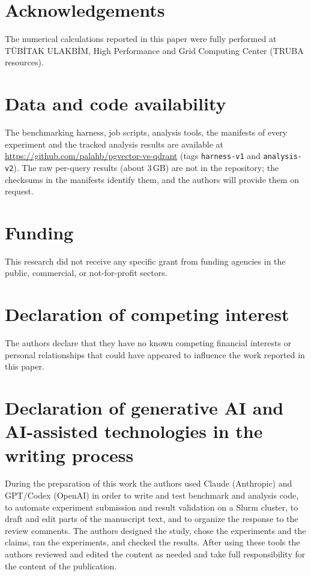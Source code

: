 \documentclass[preprint,12pt]{elsarticle}
\begin{document}
\section*{Acknowledgements}
The numerical calculations reported in this paper were fully performed at TÜBİTAK
ULAKBİM, High Performance and Grid Computing Center (TRUBA resources).

\section*{Data and code availability}
The benchmarking harness, job scripts, analysis tools, the manifests of every experiment and the tracked analysis results are available at
\url{https://github.com/palahb/pgvector-vs-qdrant} (tags \texttt{harness-v1} and \texttt{analysis-v2}). The raw per-query results (about 3\,GB) are not in the
repository; the checksums in the manifests identify them, and the authors will provide them on request.

\section*{Funding}
This research did not receive any specific grant from funding agencies in the public, commercial, or not-for-profit sectors.

\section*{Declaration of competing interest}
The authors declare that they have no known competing financial interests or personal relationships that could have appeared to influence the work reported in this paper.

\section*{Declaration of generative AI and AI-assisted technologies in the writing process}
During the preparation of this work the authors used Claude (Anthropic) and GPT/Codex (OpenAI) in order to write and test benchmark and analysis code, to automate experiment submission and result validation on a Slurm cluster, to draft and edit parts of the manuscript text, and to organize the response to the review comments. The authors designed the study, chose the experiments and the claims, ran the experiments, and checked the results. After using these tools the authors reviewed and edited the content as needed and take full responsibility for the content of the publication.
\end{document}
